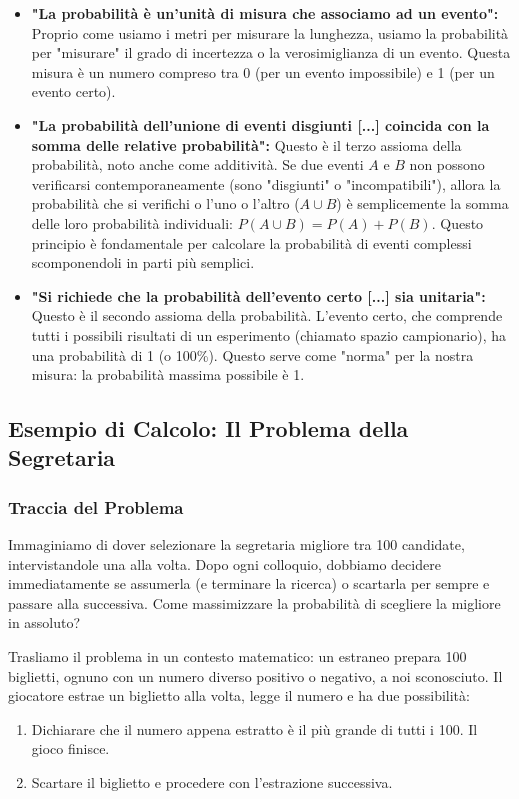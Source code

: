 \begin{itemize}
    \item \textbf{"La probabilità è un'unità di misura che associamo ad un evento":} Proprio come usiamo i metri per misurare la lunghezza, usiamo la probabilità per "misurare" il grado di incertezza o la verosimiglianza di un evento. Questa misura è un numero compreso tra 0 (per un evento impossibile) e 1 (per un evento certo).
    \item \textbf{"La probabilità dell'unione di eventi disgiunti [...] coincida con la somma delle relative probabilità":} Questo è il terzo assioma della probabilità, noto anche come additività. Se due eventi $A$ e $B$ non possono verificarsi contemporaneamente (sono "disgiunti" o "incompatibili"), allora la probabilità che si verifichi o l'uno o l'altro ($A \cup B$) è semplicemente la somma delle loro probabilità individuali: $P(A \cup B) = P(A) + P(B)$. Questo principio è fondamentale per calcolare la probabilità di eventi complessi scomponendoli in parti più semplici.
    \item \textbf{"Si richiede che la probabilità dell’evento certo [...] sia unitaria":} Questo è il secondo assioma della probabilità. L'evento certo, che comprende tutti i possibili risultati di un esperimento (chiamato spazio campionario), ha una probabilità di 1 (o 100\%). Questo serve come "norma" per la nostra misura: la probabilità massima possibile è 1.
\end{itemize}

\subsection{Esempio di Calcolo: Il Problema della Segretaria}

\subsubsection{Traccia del Problema}
Immaginiamo di dover selezionare la segretaria migliore tra 100 candidate, intervistandole una alla volta. Dopo ogni colloquio, dobbiamo decidere immediatamente se assumerla (e terminare la ricerca) o scartarla per sempre e passare alla successiva. Come massimizzare la probabilità di scegliere la migliore in assoluto?

Trasliamo il problema in un contesto matematico: un estraneo prepara 100 biglietti, ognuno con un numero diverso positivo o negativo, a noi sconosciuto. Il giocatore estrae un biglietto alla volta, legge il numero e ha due possibilità:
\begin{enumerate}
    \item Dichiarare che il numero appena estratto è il più grande di tutti i 100. Il gioco finisce.
    \item Scartare il biglietto e procedere con l'estrazione successiva.
\end{enumerate}

